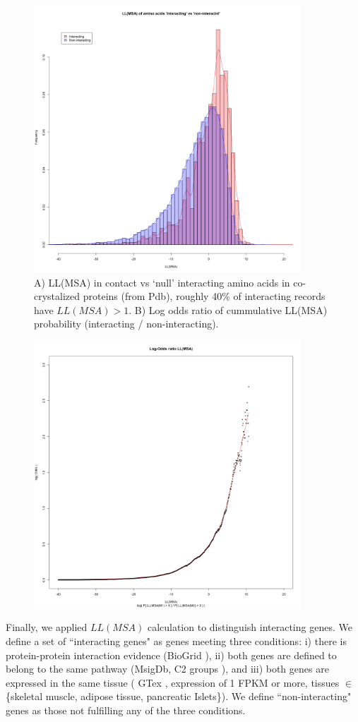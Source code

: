 \begin{figure}
    \centering
    \includegraphics[width=10cm]{gwas_figure_3A.png}
	\caption{A) LL(MSA) in contact vs ‘null’ interacting amino acids in co-crystalized proteins (from Pdb), roughly 40\% of interacting records have $LL(MSA) > 1$. B) Log odds ratio of cummulative LL(MSA) probability (interacting / non-interacting).}
    \label{fig:gwasf3a}
\end{figure}
\begin{figure}
    \centering
    \includegraphics[width=10cm]{gwas_figure_3B.png}
    \label{fig:gwasf3b}
\end{figure}

Finally, we applied $LL(MSA)$ calculation to distinguish interacting genes. We define a set of ``interacting genes" as genes meeting three conditions: i) there is protein-protein interaction evidence (BioGrid \cite{REF}), ii) both genes are defined to belong to the same pathway (MsigDb, C2 groups \cite{REF}), and iii) both genes are expressed in the same tissue ( GTex \cite{REF}, expression of 1 FPKM or more, tissues $\in$ \{skeletal muscle, adipose tissue, pancreatic Islets\}). We define ``non-interacting" genes as those not fulfilling any of the three conditions.


